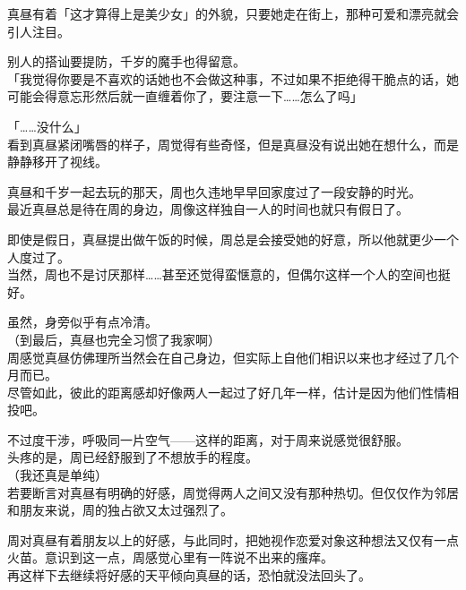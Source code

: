 真昼有着「这才算得上是美少女」的外貌，只要她走在街上，那种可爱和漂亮就会引人注目。

别人的搭讪要提防，千岁的魔手也得留意。\\

「我觉得你要是不喜欢的话她也不会做这种事，不过如果不拒绝得干脆点的话，她可能会得意忘形然后就一直缠着你了，要注意一下……怎么了吗」

「……没什么」\\

看到真昼紧闭嘴唇的样子，周觉得有些奇怪，但是真昼没有说出她在想什么，而是静静移开了视线。\\

\vspace{2\baselineskip}

真昼和千岁一起去玩的那天，周也久违地早早回家度过了一段安静的时光。\\

最近真昼总是待在周的身边，周像这样独自一人的时间也就只有假日了。

即使是假日，真昼提出做午饭的时候，周总是会接受她的好意，所以他就更少一个人度过了。\\

当然，周也不是讨厌那样……甚至还觉得蛮惬意的，但偶尔这样一个人的空间也挺好。

虽然，身旁似乎有点冷清。\\

（到最后，真昼也完全习惯了我家啊）\\

周感觉真昼仿佛理所当然会在自己身边，但实际上自他们相识以来也才经过了几个月而已。\\

尽管如此，彼此的距离感却好像两人一起过了好几年一样，估计是因为他们性情相投吧。

不过度干涉，呼吸同一片空气——这样的距离，对于周来说感觉很舒服。\\

头疼的是，周已经舒服到了不想放手的程度。\\

（我还真是单纯）\\

若要断言对真昼有明确的好感，周觉得两人之间又没有那种热切。但仅仅作为邻居和朋友来说，周的独占欲又太过强烈了。

周对真昼有着朋友以上的好感，与此同时，把她视作恋爱对象这种想法又仅有一点火苗。意识到这一点，周感觉心里有一阵说不出来的瘙痒。\\

再这样下去继续将好感的天平倾向真昼的话，恐怕就没法回头了。

